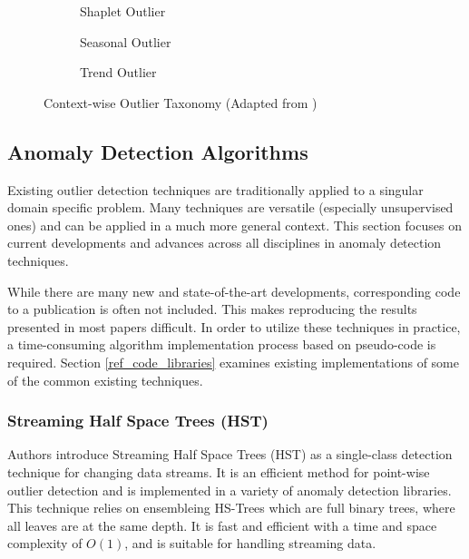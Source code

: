 

\begin{figure}[H]
     \centering
     \begin{subfigure}[b]{0.3\textwidth}
         \centering
         {\resizebox{\textwidth}{!}{}}
         \caption{Shaplet Outlier}
         \label{fig:shaplet}
     \end{subfigure}
     \hfill
     \begin{subfigure}[b]{0.3\textwidth}
         \centering
         {\resizebox{\textwidth}{!}{}}
         \caption{Seasonal Outlier}
         \label{fig:seasonal}
     \end{subfigure}
     \hfill
     \begin{subfigure}[b]{0.3\textwidth}
         \centering
         {\resizebox{\textwidth}{!}{}}
         \caption{Trend Outlier}
         \label{fig:trend}
     \end{subfigure}
        \caption{Context-wise Outlier Taxonomy (Adapted from \cite{lai2021revisiting})}
        \label{fig:contextual-outliers}
\end{figure}

\subsection{Anomaly Detection Algorithms}
\label{ref_anomaly_detection_alg}

Existing outlier detection techniques are traditionally applied to a singular domain specific problem.
Many techniques are versatile (especially unsupervised ones) and can be applied in a much more general context.
This section focuses on current developments and advances across all disciplines in anomaly detection techniques.

While there are many new and state-of-the-art developments, corresponding code to a publication is often not included.
This makes reproducing the results presented in most papers difficult.
In order to utilize these techniques in practice, a time-consuming algorithm implementation process based on pseudo-code is required.
Section \ref{ref_code_libraries} examines existing implementations of some of the common existing techniques.

\subsubsection{Streaming Half Space Trees (HST)}
Authors \cite{fast-anomaly-detection-streaming} introduce Streaming Half Space Trees (HST) as a single-class detection technique for changing data streams. It is an efficient method for point-wise outlier detection and is implemented in a variety of anomaly detection libraries. This technique relies on ensembleing HS-Trees which are full binary trees, where all leaves are at the same depth. It is fast and efficient with a time and space complexity of $O(1)$, and is suitable for handling streaming data.

